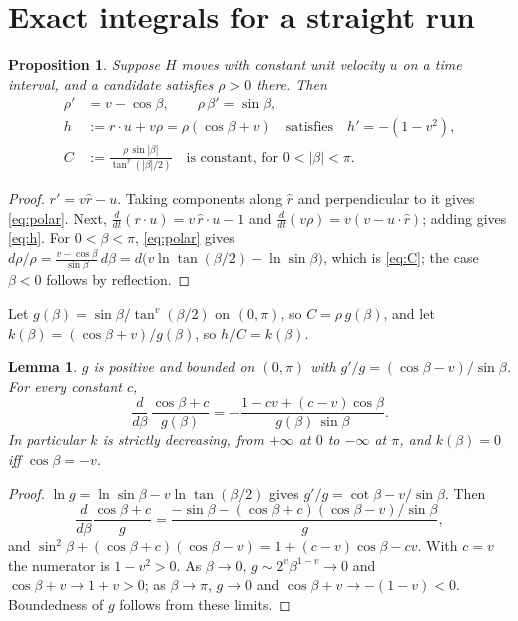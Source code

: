 \documentclass[11pt]{article}
\newtheorem{lemma}{Lemma}
\newtheorem{proposition}{Proposition}
\theoremstyle{remark}\newtheorem{remark}{Remark}
\newcommand{\rhat}{\hat r}
\begin{document}
\section{Exact integrals for a straight run}
\begin{proposition}\label{prop:integrals}
Suppose $H$ moves with constant unit velocity $u$ on a time interval, and a candidate satisfies $\rho>0$ there. Then
\begin{align}
\rho' &= v-\cos\beta,\qquad \rho\,\beta'=\sin\beta, \label{eq:polar}\\
h&:=r\cdot u+v\rho=\rho(\cos\beta+v)\quad\text{satisfies}\quad h'=-(1-v^2), \label{eq:h}\\
C&:=\frac{\rho\,\sin|\beta|}{\tan^{v}(|\beta|/2)}\quad\text{is constant, for } 0<|\beta|<\pi. \label{eq:C}
\end{align}
\end{proposition}
\begin{proof}
$r'=v\rhat-u$. Taking components along $\rhat$ and perpendicular to it gives \eqref{eq:polar}. Next,
$\frac{d}{dt}(r\cdot u)=v\,\rhat\cdot u-1$ and $\frac{d}{dt}(v\rho)=v(v-u\cdot\rhat)$; adding gives \eqref{eq:h}.
For $0<\beta<\pi$, \eqref{eq:polar} gives $d\rho/\rho=\frac{v-\cos\beta}{\sin\beta}\,d\beta
=d\bigl(v\ln\tan(\beta/2)-\ln\sin\beta\bigr)$, which is \eqref{eq:C}; the case $\beta<0$ follows by reflection.
\end{proof}

Let $g(\beta)=\sin\beta/\tan^v(\beta/2)$ on $(0,\pi)$, so $C=\rho\,g(\beta)$, and let
$k(\beta)=(\cos\beta+v)/g(\beta)$, so $h/C=k(\beta)$.

\begin{lemma}\label{lem:k}
$g$ is positive and bounded on $(0,\pi)$ with $g'/g=(\cos\beta-v)/\sin\beta$. For every constant $c$,
\begin{equation}\label{eq:Fprime}
\frac{d}{d\beta}\,\frac{\cos\beta+c}{g(\beta)}=-\frac{1-cv+(c-v)\cos\beta}{g(\beta)\,\sin\beta}.
\end{equation}
In particular $k$ is strictly decreasing, from $+\infty$ at $0$ to $-\infty$ at $\pi$, and $k(\beta)=0$ iff $\cos\beta=-v$.
\end{lemma}
\begin{proof}
$\ln g=\ln\sin\beta-v\ln\tan(\beta/2)$ gives $g'/g=\cot\beta-v/\sin\beta$. Then
\[
\frac{d}{d\beta}\frac{\cos\beta+c}{g}=\frac{-\sin\beta-(\cos\beta+c)(\cos\beta-v)/\sin\beta}{g},
\]
and $\sin^2\beta+(\cos\beta+c)(\cos\beta-v)=1+(c-v)\cos\beta-cv$. With $c=v$ the numerator is $1-v^2>0$.
As $\beta\to0$, $g\sim 2^{v}\beta^{1-v}\to0$ and $\cos\beta+v\to1+v>0$; as $\beta\to\pi$, $g\to0$ and
$\cos\beta+v\to-(1-v)<0$. Boundedness of $g$ follows from these limits.
\end{proof}
\end{document}
